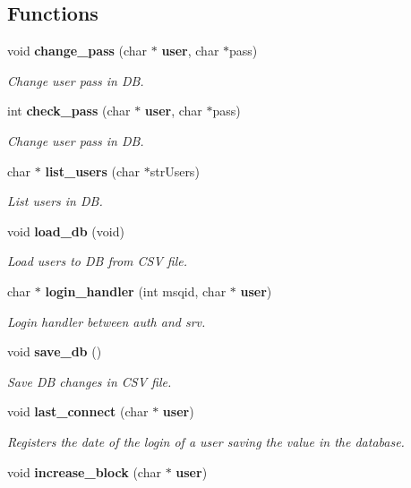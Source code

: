 \subsection*{Functions}
\begin{DoxyCompactItemize}
\item 
void \textbf{ change\+\_\+pass} (char $\ast$\textbf{ user}, char $\ast$pass)
\begin{DoxyCompactList}\small\item\em Change user pass in DB. \end{DoxyCompactList}\item 
int \textbf{ check\+\_\+pass} (char $\ast$\textbf{ user}, char $\ast$pass)
\begin{DoxyCompactList}\small\item\em Change user pass in DB. \end{DoxyCompactList}\item 
char $\ast$ \textbf{ list\+\_\+users} (char $\ast$str\+Users)
\begin{DoxyCompactList}\small\item\em List users in DB. \end{DoxyCompactList}\item 
void \textbf{ load\+\_\+db} (void)
\begin{DoxyCompactList}\small\item\em Load users to DB from C\+SV file. \end{DoxyCompactList}\item 
char $\ast$ \textbf{ login\+\_\+handler} (int msqid, char $\ast$\textbf{ user})
\begin{DoxyCompactList}\small\item\em Login handler between auth and srv. \end{DoxyCompactList}\item 
void \textbf{ save\+\_\+db} ()
\begin{DoxyCompactList}\small\item\em Save DB changes in C\+SV file. \end{DoxyCompactList}\item 
void \textbf{ last\+\_\+connect} (char $\ast$\textbf{ user})
\begin{DoxyCompactList}\small\item\em Registers the date of the login of a user saving the value in the database. \end{DoxyCompactList}\item 
void \textbf{ increase\+\_\+block} (char $\ast$\textbf{ user})

\end{DoxyCompactItemize}
